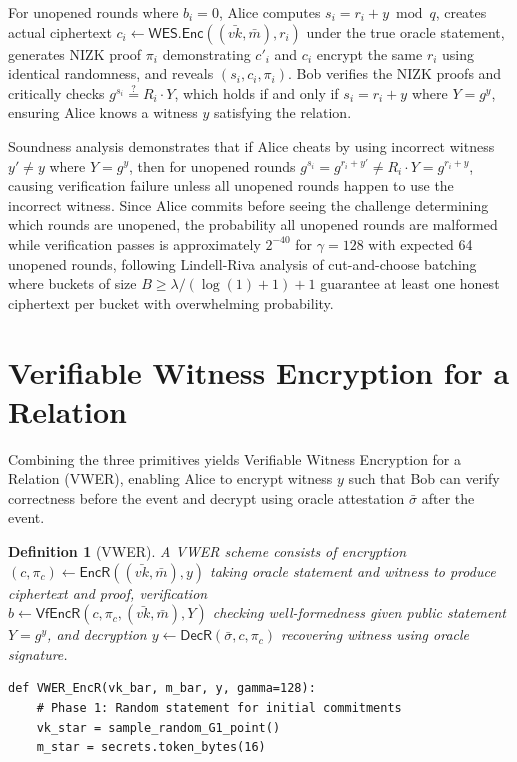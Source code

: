 \documentclass[11pt,a4paper]{article}
\newtheorem{definition}[theorem]{Definition}
\begin{document}
{For unopened rounds where $b_i = 0$, Alice computes $s_i = r_i + y \bmod q$, creates actual ciphertext $c_i \leftarrow \textsf{WES.Enc}((\bar{vk}, \bar{m}), r_i)$ under the true oracle statement, generates NIZK proof $\pi_i$ demonstrating $c'_i$ and $c_i$ encrypt the same $r_i$ using identical randomness, and reveals $(s_i, c_i, \pi_i)$. Bob verifies the NIZK proofs and critically checks $g^{s_i} \stackrel{?}{=} R_i \cdot Y$, which holds if and only if $s_i = r_i + y$ where $Y = g^y$, ensuring Alice knows a witness $y$ satisfying the relation.

Soundness analysis demonstrates that if Alice cheats by using incorrect witness $y' \neq y$ where $Y = g^y$, then for unopened rounds $g^{s_i} = g^{r_i + y'} \neq R_i \cdot Y = g^{r_i + y}$, causing verification failure unless all unopened rounds happen to use the incorrect witness. Since Alice commits before seeing the challenge determining which rounds are unopened, the probability all unopened rounds are malformed while verification passes is approximately $2^{-40}$ for $\gamma = 128$ with expected 64 unopened rounds, following Lindell-Riva analysis of cut-and-choose batching where buckets of size $B \geq \lambda/(\log(1) + 1) + 1$ guarantee at least one honest ciphertext per bucket with overwhelming probability.

\section{Verifiable Witness Encryption for a Relation}

Combining the three primitives yields Verifiable Witness Encryption for a Relation (VWER), enabling Alice to encrypt witness $y$ such that Bob can verify correctness before the event and decrypt using oracle attestation $\bar{\sigma}$ after the event.

\begin{definition}[VWER]
A VWER scheme consists of encryption $(c, \pi_c) \leftarrow \textsf{EncR}((\bar{vk}, \bar{m}), y)$ taking oracle statement and witness to produce ciphertext and proof, verification \\ $b \leftarrow \textsf{VfEncR}(c, \pi_c, (\bar{vk}, \bar{m}), Y)$ checking well-formedness given public statement $Y = g^y$, and decryption $y \leftarrow \textsf{DecR}(\bar{\sigma}, c, \pi_c)$ recovering witness using oracle signature.
\end{definition}



\begin{lstlisting}[caption={VWER Encryption Implementation}]
def VWER_EncR(vk_bar, m_bar, y, gamma=128):
    # Phase 1: Random statement for initial commitments
    vk_star = sample_random_G1_point()
    m_star = secrets.token_bytes(16)
    

\end{lstlisting}}
\end{document}
